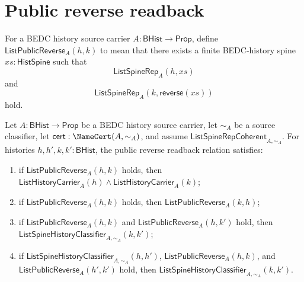 \section{Public reverse readback}
\label{sec:list-public-reverse-readback}

\begin{definition}
\label{def:list-public-reverse-readback}
For a BEDC history source carrier $A:\mathsf{BHist}\to\mathsf{Prop}$, define
$\mathsf{ListPublicReverse}_A(h,k)$ to mean that there exists a finite
BEDC-history spine $xs:\mathsf{HistSpine}$ such that
$$
\mathsf{ListSpineRep}_A(h,xs)
$$
and
$$
\mathsf{ListSpineRep}_A(k,\mathsf{reverse}(xs))
$$
hold.
\end{definition}

\begin{theorem}
\label{thm:list-public-reverse-readback-functional-involutive}
Let $A:\mathsf{BHist}\to\mathsf{Prop}$ be a BEDC history source carrier, let
$\sim_A$ be a source classifier, let $\mathsf{cert}:\NameCert(A,\sim_A)$, and
assume $\mathsf{ListSpineRepCoherent}_{A,\sim_A}$. For histories
$h,h',k,k':\mathsf{BHist}$, the public reverse readback relation satisfies:
\begin{enumerate}
  \item if $\mathsf{ListPublicReverse}_A(h,k)$ holds, then
  $\mathsf{ListHistoryCarrier}_A(h)\land\mathsf{ListHistoryCarrier}_A(k)$;
  \item if $\mathsf{ListPublicReverse}_A(h,k)$ holds, then
  $\mathsf{ListPublicReverse}_A(k,h)$;
  \item if $\mathsf{ListPublicReverse}_A(h,k)$ and
  $\mathsf{ListPublicReverse}_A(h,k')$ hold, then
  $\mathsf{ListSpineHistoryClassifier}_{A,\sim_A}(k,k')$;
  \item if $\mathsf{ListSpineHistoryClassifier}_{A,\sim_A}(h,h')$,
  $\mathsf{ListPublicReverse}_A(h,k)$, and
  $\mathsf{ListPublicReverse}_A(h',k')$ hold, then
  $\mathsf{ListSpineHistoryClassifier}_{A,\sim_A}(k,k')$.
\end{enumerate}
\end{theorem}
